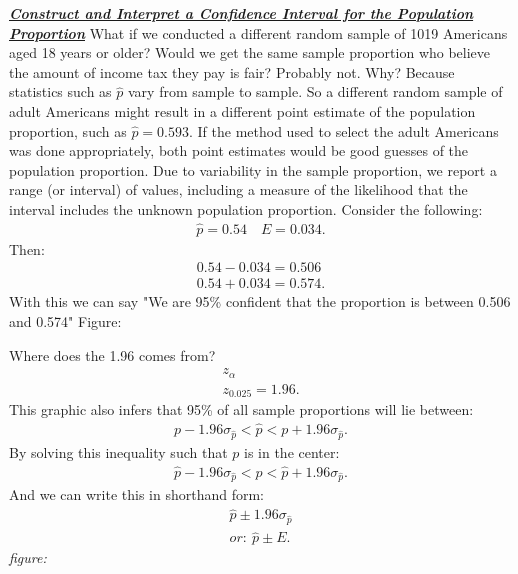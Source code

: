 \documentclass{report}
\begin{document}
    \bigbreak \noindent \bigbreak \noindent 
    \textbf{\textit{\underline{Construct and Interpret a Confidence Interval for the Population Proportion}}}
    \bigbreak \noindent 
    What if we conducted a different random sample of 1019 Americans aged 18 years or older? Would we get the same sample proportion who believe the amount of income tax they pay is fair? Probably not. Why? Because statistics such as $\hat{p}$ vary from sample to sample. So a different random sample of adult Americans might result in a different point estimate of the population proportion, such as $\hat{p}=0.593$.
    \bigbreak \noindent 
    If the method used to select the adult Americans was done appropriately, both point estimates would be good guesses of the population proportion. Due to variability in the sample proportion, we report a range (or interval) of values, including a measure of the likelihood that the interval includes the unknown population proportion.
    \bigbreak \noindent
    Consider the following:
    \begin{align*}
        \hat{p} = 0.54 \quad E = 0.034
    .\end{align*}
    Then:
    \begin{align*}
        0.54 - 0.034 = 0.506 \\
        0.54 + 0.034 = 0.574
    .\end{align*}
    With this we can say "We are 95\% confident that the proportion is between 0.506 and 0.574"
    \pagebreak \bigbreak \noindent 
    Figure:
    \bigbreak \noindent \bigbreak \noindent 
    \begin{figure}[ht]
        \centering
        \label{fig:figmanea}
    \end{figure}
    \bigbreak \noindent 
    Where does the 1.96 comes from?
    \begin{align*}
        z_{\alpha} \\
        z_{0.025} = 1.96
    .\end{align*}
    \bigbreak \noindent \bigbreak \noindent 
    This graphic also infers that 95\% of all sample proportions will lie between:
    \begin{align*}
        p-1.96\sigma_{\hat{p}} < \hat{p} < p +1.96\sigma_{\hat{p}}
    .\end{align*}
    \bigbreak \noindent \bigbreak \noindent 
    By solving this inequality such that $p $ is in the center:
    \begin{align*}
        \hat{p} -1.96\sigma_{\hat{p}} < p < \hat{p}  + 1.96 \sigma_{\hat{p}}
    .\end{align*}
    \bigbreak \noindent 
    And we can write this in shorthand form:
    \begin{align*}
        \hat{p} \pm 1.96 \sigma_{\hat{p}} \\
        or:\ \hat{p} \pm E
    .\end{align*}
    \bigbreak \noindent 
    \textit{figure:}
    \bigbreak \noindent 
\begin{figure}[ht]
    \centering
    \label{fig:fuga}
\end{figure}
\end{document}
